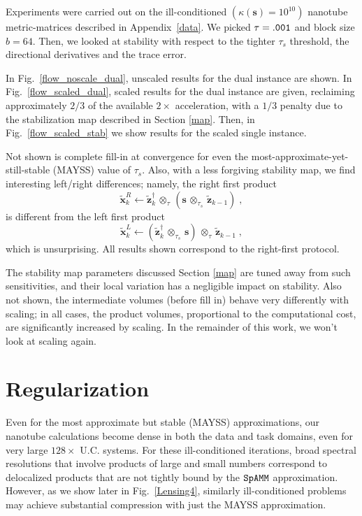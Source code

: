 \documentclass[letterpaper,twocolumn,amsmath,amsfont,amssymb,english,aps,jcp,preprintnumbers,groupaddress,nofootinbib,tightenlines,floatfix]{revtex4}
\newcommand{\mat}[1]{\boldsymbol{#1}}
\newcommand{\ot}{  {\scriptstyle \otimes}_{ \tau } }
\newcommand{\ots}{ {\scriptstyle \otimes}_{ \! \tau_s } }
\theoremstyle{plain}
\theoremstyle{remark}
\theoremstyle{plain}
\begin{document}
Experiments were carried out on the ill-conditioned $(\kappa(\mat{s})=10^{10})$ nanotube metric-matrices described in Appendix~\ref{data}.
We picked  $\tau ={\tt .001}$ and block size $b = 64$.  Then, we looked at stability with respect to the tighter $\tau_s$ threshold, 
the directional derivatives and the trace error.   

In Fig.~\ref{flow_noscale_dual}, unscaled results for the dual instance are shown.  In Fig.~\ref{flow_scaled_dual}, scaled results for the
dual instance are given, reclaiming approximately $2/3$ of the available $2 \times$ acceleration, with a $1/3$ penalty due to the
stabilization map described in Section \ref{map}. Then, in Fig.~\ref{flow_scaled_stab} we show results for the scaled single instance. 

Not shown is complete fill-in at convergence for even the most-approximate-yet-still-stable (MAYSS) value of $\tau_s$.  
Also, with a less forgiving stability map, we find interesting 
left/right differences;  namely, the right first product 
\begin{equation} 
\widetilde{\mat{x}}^R_k \leftarrow \widetilde{\mat{z}}^\dagger_{k} \, \ot  \, \left( \mat{s} \,  \ots \, \widetilde{\mat{z}}_{k-1}  \right) \; ,
\end{equation}
is  different from the left first product 
\begin{equation} 
\widetilde{\mat{x}}^L_k \leftarrow \left(  \widetilde{\mat{z}}^\dagger_{k} \, \ots \, \mat{s} \right) \,  \ot  \, \widetilde{\mat{z}}_{k-1} \; ,
\end{equation}
which is unsurprising.  All results shown correspond to the right-first protocol.

The stability map parameters discussed Section \ref{map} 
are tuned away from such sensitivities, and their local variation has a negligible impact on stability.  
Also not shown, the intermediate volumes (before fill in) behave very differently with scaling; in all cases, the product volumes,
proportional to the computational cost, are significantly increased by scaling.  In the remainder of this work, we won't look at scaling again.

\section{Regularization}\label{regularization}

Even for the most approximate but stable (MAYSS) approximations, our nanotube calculations become dense in both the data and task domains, 
even for very large $128 \times$ U.C. systems.  For these ill-conditioned iterations, broad spectral resolutions that involve products of 
large and small numbers correspond to delocalized products that are not tightly bound by the $\tt SpAMM$ approximation.   However, as 
we show later in Fig.~\ref{Lensing4}, similarly ill-conditioned problems may achieve substantial compression with just the MAYSS 
approximation. 
\end{document}
